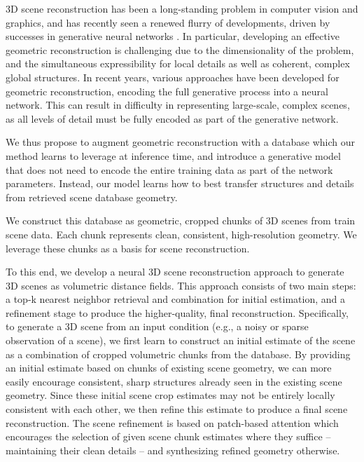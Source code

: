 3D scene reconstruction has been a long-standing problem in computer vision and graphics, and has recently seen a renewed flurry of developments, driven by successes in generative neural networks \cite{deepsdf,mescheder2019occupancy,dai2020sg,peng2020convolutional}.
In particular, developing an effective geometric reconstruction is challenging due to the dimensionality of the problem, and the simultaneous expressibility for local details as well as coherent, complex global structures.
In recent years, various approaches have been developed for geometric reconstruction, encoding the full generative process into a neural network. This can result in difficulty in representing large-scale, complex scenes, as all levels of detail must be fully encoded as part of the generative network. 

We thus propose to augment geometric reconstruction with a database which our method learns to leverage at inference time, and introduce a generative model that does not need to encode the entire training data as part of the network parameters. Instead, our model learns how to best transfer structures and details from retrieved scene database geometry.

We construct this database as geometric, cropped chunks of 3D scenes from train scene data.
Each chunk represents clean, consistent, high-resolution geometry.
We leverage these chunks as a basis for scene reconstruction.

To this end, we develop a neural 3D scene reconstruction approach to generate 3D scenes as volumetric distance fields. This approach consists of two main steps: a top-k nearest neighbor retrieval and combination for initial estimation, and a refinement stage to produce the higher-quality, final reconstruction.
Specifically, to generate a 3D scene from an input condition (e.g., a noisy or sparse observation of a scene), we first learn to construct an initial estimate of the scene as a combination of cropped volumetric chunks from the database.
By providing an initial estimate based on chunks of existing scene geometry, we can more easily encourage consistent, sharp structures already seen in the existing scene geometry.
Since these initial scene crop estimates may not be entirely locally consistent with each other, we then refine this estimate to produce a final scene reconstruction.
The scene refinement is based on patch-based attention which encourages the selection of given scene chunk estimates where they suffice -- maintaining their clean details -- and synthesizing refined geometry otherwise.

